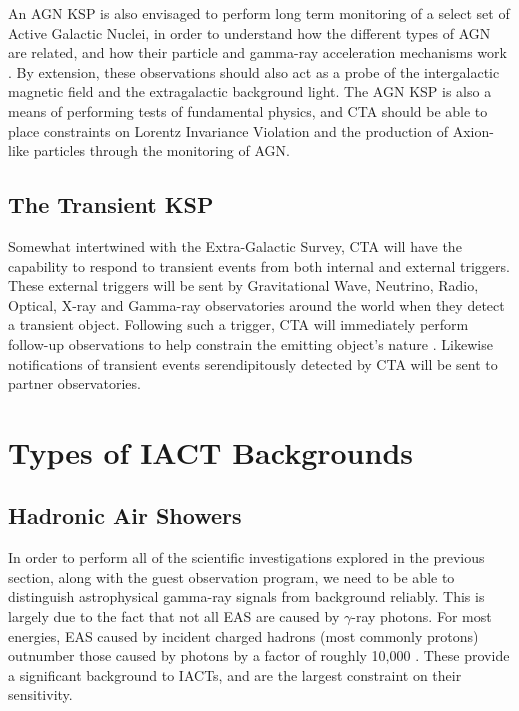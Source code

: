 An AGN KSP is also envisaged to perform long term monitoring of a select set of Active Galactic Nuclei, in order to understand how the different types of AGN are related, and how their particle and gamma-ray acceleration mechanisms work \cite{scienceCTA}. By extension, these observations should also act as a probe of the intergalactic magnetic field and the extragalactic background light. The AGN KSP is also a means of performing tests of fundamental physics, and CTA should be able to place constraints on Lorentz Invariance Violation and the production of Axion-like particles through the monitoring of AGN. 

\subsection{The Transient KSP} Somewhat intertwined with the Extra-Galactic Survey, CTA will have the capability to respond to transient events from both internal and external triggers. These external triggers will be sent by Gravitational Wave, Neutrino, Radio, Optical, X-ray and Gamma-ray observatories around the world when they detect a transient object. Following such a trigger, CTA will immediately perform follow-up observations to help constrain the emitting object's nature \cite{scienceCTA}. Likewise notifications of transient events serendipitously detected by CTA will be sent to partner observatories.

\section{Types of IACT Backgrounds}
\subsection{Hadronic Air Showers}

In order to perform all of the scientific investigations explored in the previous section, along with the guest observation program, we need to be able to distinguish astrophysical gamma-ray signals from background reliably. This is largely due to the fact that not all EAS are caused by $\gamma$-ray photons. For most energies, EAS caused by incident charged hadrons (most commonly protons) outnumber those caused by photons by a factor of roughly 10,000 \cite{Benbow}. These provide a significant background to IACTs, and are the largest constraint on their sensitivity.

